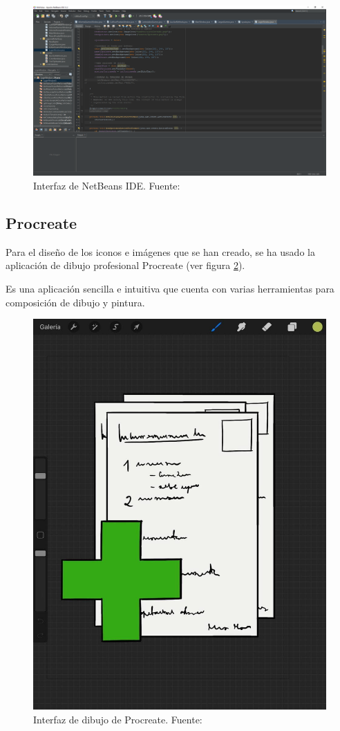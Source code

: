\begin{figure}[h]
\centering\includegraphics[width=1\linewidth]{figs/netbeans.png}
\caption{Interfaz de NetBeans IDE. Fuente: \cite{netbeans}}
\label{Fig:netbeans}
\end{figure}


\subsection{Procreate}
\label{sub:procreate}
Para el diseño de los iconos e imágenes que se han creado, se ha usado la aplicación de dibujo profesional Procreate (ver figura \ref{Fig:procreate}).

Es una aplicación sencilla e intuitiva que cuenta con varias herramientas para composición de dibujo y pintura.

\begin{figure}[h]
\centering\includegraphics[width=0.5\linewidth]{figs/procreate.jpg}
\caption{Interfaz de dibujo de Procreate. Fuente: \cite{procreate}}
\label{Fig:procreate}
\end{figure}


